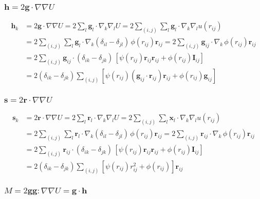 \documentclass{article}
\begin{document}
\subsubsection{$\mathbf h = 2 \mathbf g \cdot \nabla \nabla U$}

\begin{align*}
\mathbf h_k &= 2 \mathbf g \cdot \nabla \nabla U
  = 2 \sum_l \mathbf g_l \cdot \nabla_k \nabla_l U
  = 2 \sum_{(i, j)} \sum_l \mathbf g_l \cdot \nabla_k \nabla_l u(r_{ij})
\\
  &= 2 \sum_{(i, j)} \sum_l \mathbf g_l \cdot \nabla_k 
    (\delta_{il} - \delta_{jl}) \, \phi(r_{ij}) \mathbf r_{ij} 
  = 2 \sum_{(i, j)} \mathbf g_{ij} \cdot \nabla_k 
    \, \phi(r_{ij}) \mathbf r_{ij}
\\
  &= 2 \sum_{(i, j)} \mathbf g_{ij} \cdot 
    (\delta_{ik} - \delta_{jk}) \, 
    [\psi(r_{ij}) \mathbf r_{ij} \mathbf r_{ij}
    + \phi(r_{ij}) \mathbf I_{ij}]
\\
  &= 2 (\delta_{ik} - \delta_{jk}) 
      \sum_{(i, j)} [\psi(r_{ij}) (\mathbf g_{ij} \cdot \mathbf r_{ij}) \mathbf r_{ij}
    + \phi(r_{ij}) \mathbf g_{ij}]
\end{align*}



\subsubsection{$\mathbf s = 2 \mathbf r \cdot \nabla \nabla U$}

\begin{align*}
\mathbf s_k &= 2 \mathbf r \cdot \nabla \nabla U
  = 2 \sum_l \mathbf r_l \cdot \nabla_k \nabla_l U
  = 2 \sum_{(i, j)} \sum_l \mathbf x_l \cdot \nabla_k \nabla_l u(r_{ij})
\\
  &= 2 \sum_{(i, j)} \sum_l \mathbf r_l \cdot \nabla_k 
    (\delta_{il} - \delta_{jl}) \, \phi(r_{ij}) \mathbf r_{ij} 
  = 2 \sum_{(i, j)} \mathbf r_{ij} \cdot \nabla_k 
    \, \phi(r_{ij}) \mathbf r_{ij}
\\
  &= 2 \sum_{(i, j)} \mathbf r_{ij} \cdot 
    (\delta_{ik} - \delta_{jk}) \, 
    [\psi(r_{ij}) \mathbf r_{ij} \mathbf r_{ij}
    + \phi(r_{ij}) \mathbf I_{ij}]
\\
  &= 2 (\delta_{ik} - \delta_{jk}) 
      \sum_{(i, j)} [\psi(r_{ij}) r_{ij}^2 + \phi(r_{ij}) ] \mathbf r_{ij}
\end{align*}



\subsubsection{$M = 2 \mathbf g \mathbf g : \nabla \nabla U = \mathbf g \cdot \mathbf h$}
\end{document}
